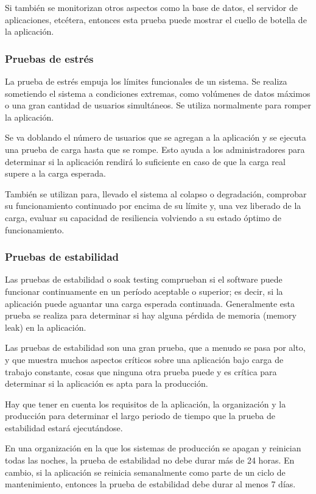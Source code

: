 Si también se monitorizan otros aspectos como la base de datos, el servidor de aplicaciones, etcétera, entonces esta prueba puede mostrar el cuello de botella de la aplicación.

\subsubsection{Pruebas de estrés}

La prueba de estrés empuja los límites funcionales de un sistema. Se realiza sometiendo el sistema a condiciones extremas, como volúmenes de datos máximos o una gran cantidad de usuarios simultáneos. Se utiliza normalmente para romper la aplicación.

Se va doblando el número de usuarios que se agregan a la aplicación y se ejecuta una prueba de carga hasta que se rompe. Esto ayuda a los administradores para determinar si la aplicación rendirá lo suficiente en caso de que la carga real supere a la carga esperada.

También se utilizan para, llevado el sistema al colapso o degradación, comprobar su funcionamiento continuado por encima de su límite y, una vez liberado de la carga, evaluar su capacidad de resiliencia volviendo a su estado óptimo de funcionamiento.

\subsubsection{Pruebas de estabilidad}

Las pruebas de estabilidad o soak testing comprueban si el software puede funcionar continuamente en un período aceptable o superior; es decir, si la aplicación puede aguantar una carga esperada continuada. Generalmente esta prueba se realiza para determinar si hay alguna pérdida de memoria (memory leak) en la aplicación.

Las pruebas de estabilidad son una gran prueba, que a menudo se pasa por alto, y que muestra muchos aspectos críticos sobre una aplicación bajo carga de trabajo constante, cosas que ninguna otra prueba puede y es crítica para determinar si la aplicación es apta para la producción.

Hay que tener en cuenta los requisitos de la aplicación, la organización y la producción para determinar el largo periodo de tiempo que la prueba de estabilidad estará ejecutándose.

En una organización en la que los sistemas de producción se apagan y reinician todas las noches, la prueba de estabilidad no debe durar más de 24 horas. En cambio, si la aplicación se reinicia semanalmente como parte de un ciclo de mantenimiento, entonces la prueba de estabilidad debe durar al menos 7 días.

